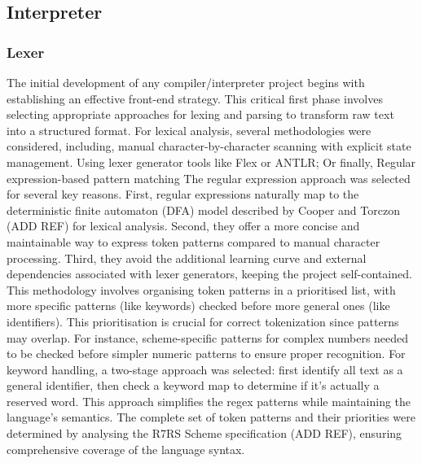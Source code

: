 \documentclass[final]{cmpreport_02}
\begin{document}
\subsection{Interpreter}

\subsubsection{Lexer}
The initial development of any compiler/interpreter project begins with establishing an effective front-end strategy. This critical first phase involves selecting appropriate approaches for lexing and parsing to transform raw text into a structured format.
For lexical analysis, several methodologies were considered, including, manual character-by-character scanning with explicit state management. Using lexer generator tools like Flex or ANTLR; Or finally, Regular expression-based pattern matching
The regular expression approach was selected for several key reasons. 
First, regular expressions naturally map to the deterministic finite automaton (DFA) model described by Cooper and Torczon (ADD REF) for lexical analysis. Second, they offer a more concise and maintainable way to express token patterns compared to manual character processing. Third, they avoid the additional learning curve and external dependencies associated with lexer generators, keeping the project self-contained.
This methodology involves organising token patterns in a prioritised list, with more specific patterns (like keywords) checked before more general ones (like identifiers). This prioritisation is crucial for correct tokenization since patterns may overlap. For instance, scheme-specific patterns for complex numbers needed to be checked before simpler numeric patterns to ensure proper recognition.
For keyword handling, a two-stage approach was selected: first identify all text as a general identifier, then check a keyword map to determine if it's actually a reserved word. This approach simplifies the regex patterns while maintaining the language's semantics.
The complete set of token patterns and their priorities were determined by analysing the R7RS Scheme specification (ADD REF), ensuring comprehensive coverage of the language syntax.
\end{document}
